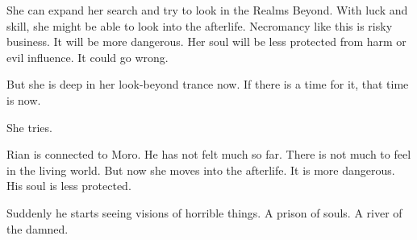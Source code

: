 
She can expand her search and try to look in the Realms Beyond. 
With luck and skill, she might be able to look into the afterlife. 
Necromancy like this is risky business. 
It will be more dangerous.
Her soul will be less protected from harm or evil influence. 
It could go wrong. 

But she is deep in her look-beyond trance now.
If there is a time for it, that time is now. 

She tries. 




\begin{comment}
  \section{Rian sees \sephiroth}
\end{comment}
\new
Rian is connected to Moro. 
He has not felt much so far. 
There is not much to feel in the living world. 
But now she moves into the afterlife. 
It is more dangerous. 
His soul is less protected. 

Suddenly he starts seeing visions of horrible things. 
A prison of souls.
A river of the damned. 


